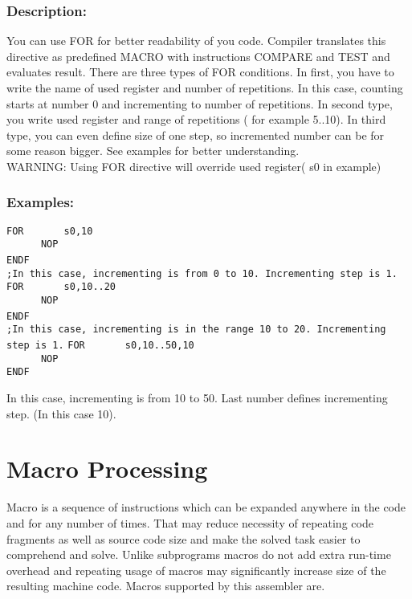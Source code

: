         \subsubsection{Description:}
            You can use FOR for better readability of you code. Compiler translates this directive as predefined MACRO with instructions COMPARE and TEST and evaluates result. There are three types of FOR conditions. In first, you have to write the name of used register and number of repetitions. In this case, counting starts at number 0 and incrementing to number of repetitions. In second type, you write used register and range of repetitions ( for example 5..10). In third type, you can even define size of one step, so incremented number can be for some reason bigger. See examples for better understanding.\\ WARNING: Using FOR directive will override used register( s0 in example)

        \subsubsection{Examples:}
            {
                \usecodefont
                \verb'FOR       s0,10'\\
                \verb'      NOP'\\
                \verb'ENDF'
                ~\\
                \verb';In this case, incrementing is from 0 to 10. Incrementing step is 1.'
                \verb'FOR       s0,10..20'\\
                \verb'      NOP'\\
                \verb'ENDF'
                ~\\
                \verb';In this case, incrementing is in the range 10 to 20. Incrementing step is 1.'
                \verb'FOR       s0,10..50,10'\\
                \verb'      NOP'\\
                \verb'ENDF'
            }

            In this case, incrementing is from 10 to 50. Last number defines incrementing step. (In this case 10).\\

\section{Macro Processing}
    Macro is a sequence of instructions which can be expanded anywhere in the code and for any number of times. That may reduce necessity of repeating code fragments as well as source code size and make the solved task easier to comprehend and solve. Unlike subprograms macros do not add extra run-time overhead and repeating usage of macros may significantly increase size of the resulting machine code. Macros supported by this assembler are.

